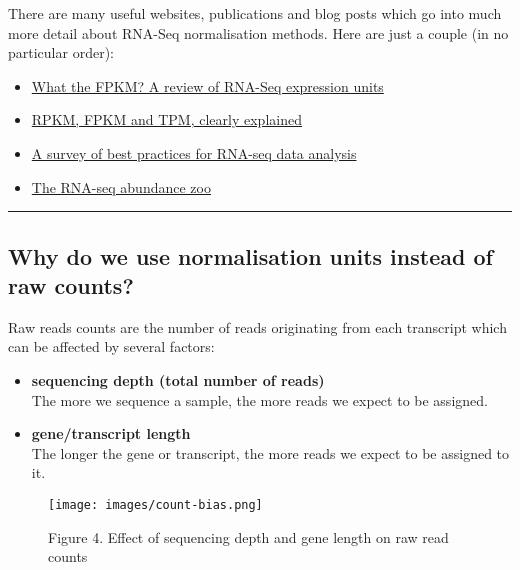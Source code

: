 \documentclass[11pt]{article}
\providecommand{\tightlist}{%
      \setlength{\itemsep}{0pt}\setlength{\parskip}{0pt}}
\begin{document}
There are many useful websites, publications and blog posts which go
into much more detail about RNA-Seq normalisation methods. Here are just
a couple (in no particular order):

\begin{itemize}
\tightlist
\item
  \href{https://haroldpimentel.wordpress.com/2014/05/08/what-the-fpkm-a-review-rna-seq-expression-units/}{What
  the FPKM? A review of RNA-Seq expression units}
\item
  \href{https://statquest.org/2015/07/09/rpkm-fpkm-and-tpm-clearly-explained/}{RPKM,
  FPKM and TPM, clearly explained}
\item
  \href{https://www.ncbi.nlm.nih.gov/pmc/articles/PMC4728800/}{A survey
  of best practices for RNA-seq data analysis}
\item
  \href{http://robpatro.com/blog/?p=235}{The RNA-seq abundance zoo}
\end{itemize}

    \begin{center}\rule{0.5\linewidth}{.4pt}\end{center}

    \hypertarget{why-do-we-use-normalisation-units-instead-of-raw-counts}{%
\subsection{Why do we use normalisation units instead of raw
counts?}\label{why-do-we-use-normalisation-units-instead-of-raw-counts}}

Raw reads counts are the number of reads originating from each
transcript which can be affected by several factors:

\begin{itemize}
\item
  \textbf{sequencing depth (total number of reads)}\\
  The more we sequence a sample, the more reads we expect to be
  assigned.
\item
  \textbf{gene/transcript length}\\
  The longer the gene or transcript, the more reads we expect to be
  assigned to it.
\end{itemize}

    \begin{figure}[!h]
\centering
\texttt{[image: images/count-bias.png]}
\caption{Figure 4. Effect of sequencing depth and gene length on raw
read counts}
\end{figure}
\end{document}

